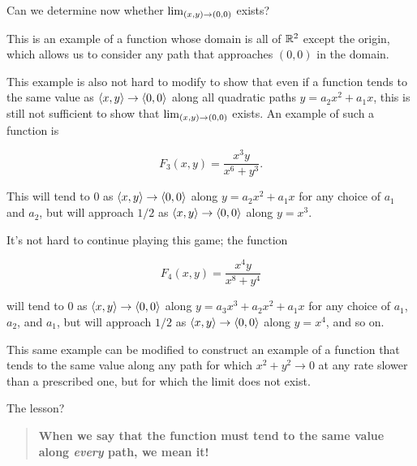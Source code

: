 \documentclass{ximera}
\begin{document}
\begin{exercise}
\begin{exercise}
Can we determine now whether $\lim_{\left(x,y\right) \to \left(0,0\right)}$ exists?
 
\begin{multipleChoice}
\end{multipleChoice}

\begin{remark}
This is an example of a function whose domain is all of $\mathbb R^2$ except the origin, which allows us to consider any path that approaches $(0,0)$ in the domain.

This example is also not hard to modify to show that even if a function tends to the same value as $\left\langle x,y\right\rangle \to \left\langle 0,0\right\rangle$ along all quadratic paths $y=a_2x^2+a_1x$, this is still not sufficient to show that  $\lim_{\left(x,y\right) \to \left(0,0\right)}$ exists.  An example of such a function is 

\[
F_3(x,y) = \frac{x^3y}{x^6+y^3}.
\]

This will tend to $0$ as $\left\langle x,y\right\rangle \to \left\langle 0,0\right\rangle$ along $y=a_2x^2+a_1x$ for any choice of $a_1$ and $a_2$, but will approach $1/2$ as $\left\langle x,y\right\rangle \to \left\langle 0,0\right\rangle$ along $y=x^3$.

It's not hard to continue playing this game; the function

\[
F_4(x,y) = \frac{x^4y}{x^8+y^4}
\]

will tend to $0$ as $\left\langle x,y\right\rangle \to \left\langle 0,0\right\rangle$ along $y=a_3x^3+a_2x^2+a_1x$ for any choice of $a_1$, $a_2$, and $a_1$, but will approach $1/2$ as $\left\langle x,y\right\rangle \to \left\langle 0,0\right\rangle$ along $y=x^4$, and so on.

This same example can be modified to construct an example of a function that tends to the same value along any path for which $x^2+y^2 \to 0$ at any rate slower than a prescribed one, but for which the limit does not exist.

The lesson?

\begin{quote}
\textbf{When we say that the function must tend to the same value along \emph{every} path, we mean it!}
\end{quote}
\end{remark}

 \end{exercise}
 \end{exercise}
\end{document}
